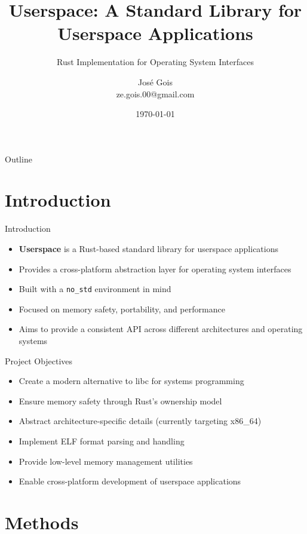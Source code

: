 \documentclass{beamer}
\title{Userspace: A Standard Library for Userspace Applications}
\subtitle{Rust Implementation for Operating System Interfaces}
\author{José Gois \\ \small{ze.gois.00@gmail.com}}
\institute{Federal University of Rio Grande do Norte (UFRN)}
\date{\today}
\begin{document}
\begin{frame}
  \titlepage
\end{frame}

\begin{frame}{Outline}
  \tableofcontents
\end{frame}

\section{Introduction}

\begin{frame}{Introduction}
  \begin{itemize}
    \item \textbf{Userspace} is a Rust-based standard library for userspace applications
    \item Provides a cross-platform abstraction layer for operating system interfaces
    \item Built with a \texttt{no\_std} environment in mind
    \item Focused on memory safety, portability, and performance
    \item Aims to provide a consistent API across different architectures and operating systems
  \end{itemize}
\end{frame}

\begin{frame}{Project Objectives}
  \begin{itemize}
    \item Create a modern alternative to libc for systems programming
    \item Ensure memory safety through Rust's ownership model
    \item Abstract architecture-specific details (currently targeting x86\_64)
    \item Implement ELF format parsing and handling
    \item Provide low-level memory management utilities
    \item Enable cross-platform development of userspace applications
  \end{itemize}
\end{frame}

\section{Methods}
\end{document}
